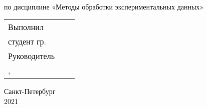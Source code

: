 \thispagestyle{empty}%
\makeatletter
{}
%
\makeatother



{\centering%
	\SPbPU\\
	{
		\institute\\
		\instituteS}
	\par}%


\vspace{0pt plus1fill} %


\vspace{0pt plus2fill} %


{\centering%
	
	\MakeUppercase{\bfseries{\DocType}} \\ 

	\intervalS%
	\MakeUppercase{\bfseries{\thesisTitle}}
	\intervalS%
\par}%

{\centering%
	\noindent	по дисциплине «Методы обработки экспериментальных данных»\\%
\par}%




\vspace{4mm plus2fill}%

\noindent
\begin{tabularx}{\linewidth}{lXl}
	Выполнил              &	   &             \\
	студент гр.~\group     &    & \Author     \\[\mfloatsep]

	Руководитель 		  &    &             \\
	\SupervisorDegree, \SupervisorTitle 	  &    & \Supervisor \\[\mfloatsep]

\end{tabularx} %


%
\vspace{0pt plus4fill}%


\begin{center}%
Санкт-Петербург\\
2021
\end{center}%
\restoregeometry
\newpage